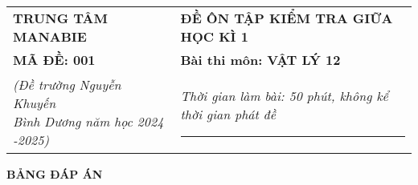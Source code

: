 \begin{tabular}{M{6.5cm}M{11cm}}
	\textbf{TRUNG TÂM MANABIE}& \textbf{ĐỀ ÔN TẬP KIỂM TRA GIỮA HỌC KÌ 1}\\
	\textbf{MÃ ĐỀ: 001}& \textbf{Bài thi môn: VẬT LÝ 12}\\
	\textit{(Đề trường Nguyễn Khuyến \newline Bình Dương năm học 2024 -2025)}& \textit{Thời gian làm bài: 50 phút, không kể thời gian phát đề}
	
	\noindent\rule{4cm}{0.8pt} \\
\end{tabular}
\setcounter{section}{0}
\begin{center}
	\textbf{\large BẢNG ĐÁP ÁN}
\end{center}
\section{}
\section{}
\section{}




